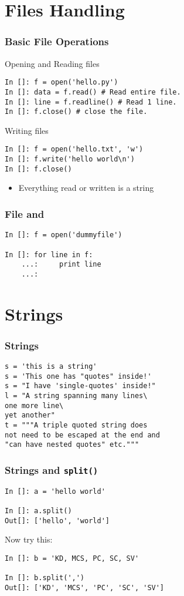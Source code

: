 \documentclass[14pt,compress]{beamer}
\newcounter{time}
\newcommand{\inctime}[1]{\addtocounter{time}{#1}{\tiny \thetime\ m}}
\newcommand{\typ}[1]{\lstinline{#1}}
\newcommand{\kwrd}[1]{ \texttt{\textbf{\color{blue}{#1}}}  }
\begin{document}
\section{Files Handling}
\begin{frame}[fragile]
  \frametitle{Basic File Operations}
Opening and Reading files
\begin{small}
\begin{lstlisting}
In []: f = open('hello.py')
In []: data = f.read() # Read entire file.
In []: line = f.readline() # Read 1 line.
In []: f.close() # close the file.
\end{lstlisting}
\end{small}
Writing files
\begin{lstlisting}
In []: f = open('hello.txt', 'w')
In []: f.write('hello world\n')
In []: f.close()
\end{lstlisting}
\begin{itemize}
    \item Everything read or written is a string
\end{itemize}
\end{frame}

\begin{frame}[fragile]
    \frametitle{File and \kwrd{for}}
\begin{lstlisting}
In []: f = open('dummyfile')

In []: for line in f:
    ...:     print line
    ...:  
\end{lstlisting}
\inctime{10}
\end{frame}

\section{Strings}
\begin{frame}[fragile]
  \frametitle{Strings}
  \begin{lstlisting}
s = 'this is a string'
s = 'This one has "quotes" inside!'
s = "I have 'single-quotes' inside!"
l = "A string spanning many lines\
one more line\
yet another"
t = """A triple quoted string does
not need to be escaped at the end and 
"can have nested quotes" etc."""
  \end{lstlisting}
\end{frame}

\begin{frame}[fragile]\frametitle{Strings and \typ{split()}}
  \begin{lstlisting}
In []: a = 'hello world'

In []: a.split()
Out[]: ['hello', 'world']
  \end{lstlisting}
Now try this:
  \begin{lstlisting}
In []: b = 'KD, MCS, PC, SC, SV'

In []: b.split(',')
Out[]: ['KD', 'MCS', 'PC', 'SC', 'SV']
  \end{lstlisting}
\inctime{5}
\end{frame}
\end{document}
